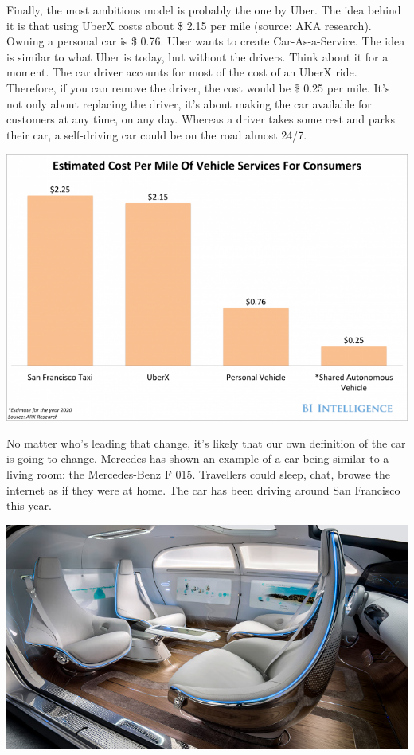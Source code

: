 \documentclass[12pt]{article}
\begin{document}
Finally, the most ambitious model is probably the one by Uber. The idea behind
it is that using UberX costs about \$ 2.15 per mile (source: AKA research).
Owning a personal car is \$ 0.76. Uber wants to create Car-As-a-Service.
The idea is similar to what Uber is today, but without the drivers. Think about
it for a moment. The car driver accounts for most of the cost of an UberX ride.
Therefore, if you can remove the driver, the cost would be \$ 0.25 per mile.
It's not only about replacing the driver, it's about making the car available
for customers at any time, on any day. Whereas a driver takes some rest and
parks their car, a self-driving car could be on the road almost 24/7.

\vspace{5mm}

\includegraphics[width=\textwidth]{vehicle-cost}

\vspace{5mm}
No matter who's leading that change, it's likely that our own definition of the
car is going to change. Mercedes has shown an example of a car being similar to
a living room: the Mercedes-Benz F 015. Travellers could sleep, chat, browse the
internet as if they were at home. The car has been driving around San Francisco
this year.

\vspace{5mm}

\includegraphics[width=\textwidth]{mercedes}
\end{document}
